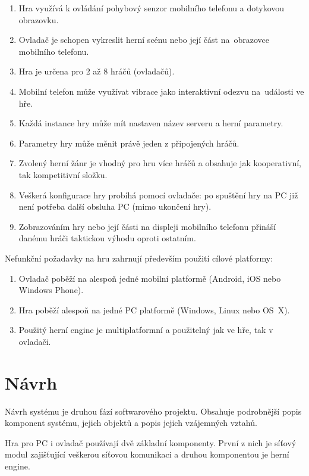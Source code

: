 \documentclass[thesis=B,czech,hidelinks]{FITthesis}[2012/06/26] %
\begin{document}
\begin{enumerate}
	\item Hra využívá k ovládání pohybový senzor mobilního telefonu a dotykovou obrazovku.
	\item Ovladač je schopen vykreslit herní scénu nebo její část na~obrazovce mobilního telefonu.
	\item Hra je určena pro 2 až 8 hráčů (ovladačů).
	\item Mobilní telefon může využívat vibrace jako interaktivní odezvu na~události ve hře.
 	\item Každá instance hry může mít nastaven název serveru a herní parametry.
	\item Parametry hry může měnit právě jeden z připojených hráčů.
	\item Zvolený herní žánr je vhodný pro hru více hráčů a obsahuje jak kooperativní, tak kompetitivní složku.
	\item Veškerá konfigurace hry probíhá pomocí ovladače: po spuštění hry na PC již není potřeba další obsluha PC (mimo ukončení hry).
	\item Zobrazováním hry nebo její části na displeji mobilního telefonu přináší danému hráči taktickou výhodu oproti ostatním.

\end{enumerate}

Nefunkční požadavky na hru zahrnují především použití cílové platformy:

\begin{enumerate}
	\item Ovladač poběží na alespoň jedné mobilní platformě (Android, iOS nebo Windows Phone).
	\item Hra poběží alespoň na jedné PC platformě (Windows, Linux nebo OS~X).
	\item Použitý herní engine je multiplatformní a použitelný jak ve hře, tak v ovladači.
\end{enumerate}

\section{Návrh}

Návrh systému je druhou fází softwarového projektu. Obsahuje podrobnější popis komponent systému, jejich objektů a popis jejich vzájemných vztahů.

Hra pro PC i ovladač používají dvě základní komponenty. První z nich je síťový modul zajišťující veškerou síťovou komunikaci a druhou komponentou je herní engine. 
\end{document}
